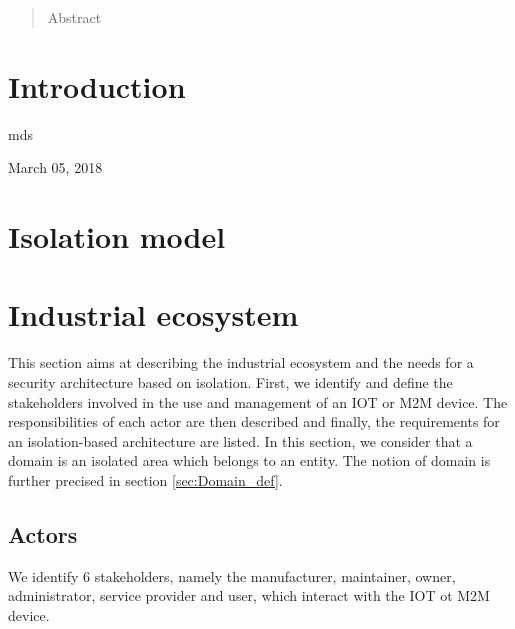 \documentclass[conference]{IEEEtran}
\begin{document}
\maketitle

\begin{abstract}
Abstract 
\lipsum[1]
\end{abstract}





%
\IEEEpeerreviewmaketitle



\section{Introduction}
\label{sec:Intro}
{}
\lipsum[1-2]
\hfill mds
 
\hfill March 05, 2018

\section{Isolation model}
\label{sec:Isolation_model}
\lipsum[1-10]

\section{Industrial ecosystem}
\label{sec:Industrial_ecosystem}
This section aims at describing the industrial ecosystem and the needs for a security architecture based on isolation. First, we identify and define the stakeholders involved in the use and management of an IOT or M2M device. The responsibilities of each actor are then described and finally, the requirements for an isolation-based architecture are listed.
In this section, we consider that a domain is an isolated area which belongs to an entity. The notion of domain is further precised in section \ref{sec:Domain_def}.

\subsection{Actors}
\label{sec:Actors}
We identify 6 stakeholders, namely the manufacturer, maintainer, owner, administrator, service provider and user, which interact with the IOT ot M2M device.
\end{document}
